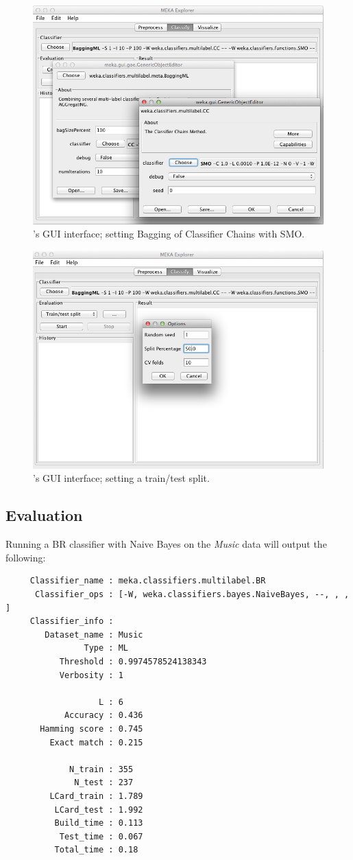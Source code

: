 \documentclass[11pt]{article}
\begin{document}
\begin{figure}
	\includegraphics[height=0.60\textwidth]{GUI02.png}
	\caption{\label{screen:eval} 's GUI interface; setting Bagging of Classifier Chains with SMO.}
\end{figure}


\begin{figure}
	\includegraphics[height=0.60\textwidth]{GUI03.png}
	\caption{\label{screen:split} 's GUI interface; setting a train/test split.}
\end{figure}

\subsection{\label{sec:evaluation}Evaluation}

Running a BR classifier with Naive Bayes on the \textit{Music} data will output the following:

{\small
\begin{lstlisting}
     Classifier_name : meka.classifiers.multilabel.BR
      Classifier_ops : [-W, weka.classifiers.bayes.NaiveBayes, --, , , ]
     Classifier_info : 
        Dataset_name : Music
                Type : ML
           Threshold : 0.9974578524138343
           Verbosity : 1

                   L : 6    
            Accuracy : 0.436
       Hamming score : 0.745
         Exact match : 0.215

             N_train : 355
              N_test : 237
         LCard_train : 1.789
          LCard_test : 1.992
          Build_time : 0.113
           Test_time : 0.067
          Total_time : 0.18 
\end{lstlisting}
}
\end{document}
